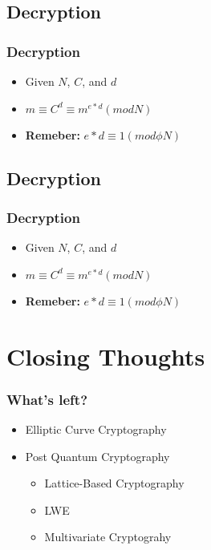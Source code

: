 \documentclass{beamer}
\begin{document}
\subsection{Decryption}
\begin{frame}
    \frametitle{Decryption}
    \begin{itemize}
        \item Given $N$, $C$, and $d$
        \item $m \equiv C^{d} \equiv m^{e*d} (mod N)$
        \item \textbf{Remeber:} $e*d \equiv 1 (mod \phi{N})$
    \end{itemize}
\end{frame}

\subsection{Decryption}
\begin{frame}
    \frametitle{Decryption}
    \begin{itemize}
        \item Given $N$, $C$, and $d$
        \item $m \equiv C^{d} \equiv m^{e*d} (mod N)$
        \item \textbf{Remeber:} $e*d \equiv 1 (mod \phi{N})$
    \end{itemize}
\end{frame}


\section{Closing Thoughts}
\begin{frame}
    \frametitle{What's left?}
    \begin{itemize}
    	\item Elliptic Curve Cryptography
       	\item Post Quantum Cryptography
    	\begin{itemize}
    		\item Lattice-Based Cryptography
    		\item LWE
    		\item Multivariate Cryptograhy
    	\end{itemize}
    \end{itemize}
\end{frame} 
\end{document}

